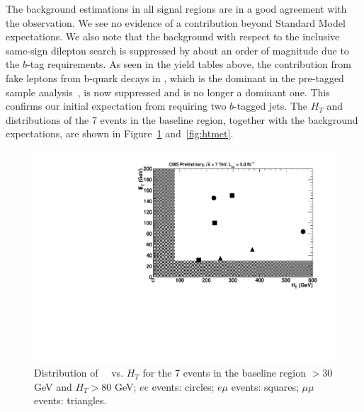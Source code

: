 \clearpage

The background estimations in all signal regions
are in a good agreement with the observation.  We see no evidence of 
a contribution beyond Standard Model expectations.
We also note that the background with respect to the inclusive same-sign
dilepton search is suppressed by about
an order of magnitude due to the $b$-tag requirements.
As seen in the yield tables above, the 
contribution from fake leptons from b-quark decays in \ttbar,
which is the dominant in the pre-tagged sample analysis~\cite{ssnote2011},
is now suppressed and is no longer a dominant one.
This confirms our initial expectation from requiring two $b$-tagged jets.
The $H_T$ and \met~ distributions of the 7 events 
in the baseline region,
together with the background expectations, are shown in 
Figure~\ref{fig:htvsmet} and~\ref{fig:htmet}.

\begin{figure}[h]
\begin{center}
\includegraphics[width=0.48\linewidth]{figs/MetVsHt.pdf}
\caption{\label{fig:htvsmet}
Distribution of \met~~vs. $H_T$ for the 7 events in the baseline region
\met$> 30$ GeV and $H_T > 80$ GeV; $ee$ events: circles; $e\mu$ events: 
squares; $\mu\mu$ events: triangles.}
\end{center}
\end{figure}

